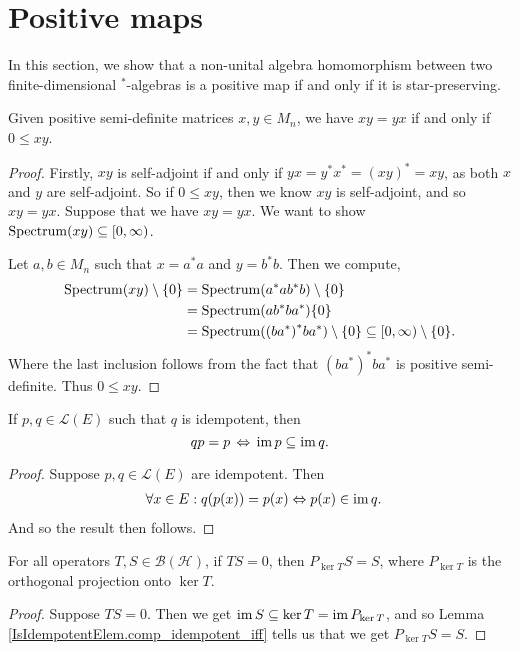 \chapter{Positive maps}

 In this section, we show that a non-unital algebra homomorphism between two finite-dimensional $^*$-algebras is a positive map if and only if it is star-preserving.

 \begin{lemma}\label{posSemidef_iff_commute}
  \leanok
  Given positive semi-definite matrices $x,y\in M_n$, we have $xy=yx$ if and only if $0\leq{xy}$.
 \end{lemma}
 \begin{proof}\leanok
  Firstly, $xy$ is self-adjoint if and only if $yx=y^*x^*=(xy)^*=xy$, as both $x$ and $y$ are self-adjoint.
  So if $0\leq xy$, then we know $xy$ is self-adjoint, and so $xy=yx$.
  Suppose that we have $xy=yx$. We want to show $\operatorname{Spectrum}(xy)\subseteq[0,\infty)$.
 
  Let $a,b\in M_n$ such that $x=a^*a$ and $y=b^*b$. Then we compute,
  \begin{align*}
   \operatorname{Spectrum}(xy)\setminus\{0\} &= \operatorname{Spectrum}(a^*ab^*b)\setminus\{0\}\\
   &= \operatorname{Spectrum}(ab^*ba^*)\{0\}\\
   &= \operatorname{Spectrum}({(ba^*)}^*ba^*)\setminus\{0\}\subseteq[0,\infty)\setminus\{0\}.
  \end{align*}
  Where the last inclusion follows from the fact that ${(ba^*)}^*ba^*$ is positive semi-definite.
  Thus $0\leq xy$.
 \end{proof}

 \begin{lemma}\label{comp_idempotent_iff}
  \leanok
  If $p,q\in \mathcal{L}(E)$ such that $q$ is idempotent, then
  \[qp=p \,\Leftrightarrow\, \operatorname{im}{p}\subseteq\operatorname{im}{q}.\]
 \end{lemma}
 \begin{proof}\leanok
  Suppose $p,q\in\mathcal{L}(E)$ are idempotent. Then
  \begin{align*}
   &\quad\;\;\forall{x}\in{E}:q(p(x))=p(x) \Leftrightarrow p(x)\in\operatorname{im}{q}.
  \end{align*}
  And so the result then follows.
 \end{proof}

 \begin{corollary}\label{orthogonalProjection_ker_comp_eq_of_comp_eq_zero}
  \leanok
  For all operators $T,S\in\mathcal{B}(\mathcal{H})$, if $TS=0$, then $P_{\ker{T}}S=S$, where $P_{\ker{T}}$ is the orthogonal projection onto $\ker{T}$.
 \end{corollary}
 \begin{proof}\leanok
  Suppose $TS=0$. Then we get $\operatorname{im}{S}\subseteq\ker{T}=\operatorname{im}{P_{\ker{T}}}$, and so Lemma \ref{IsIdempotentElem.comp_idempotent_iff} tells us that we get $P_{\ker{T}}S=S$.
 \end{proof}

